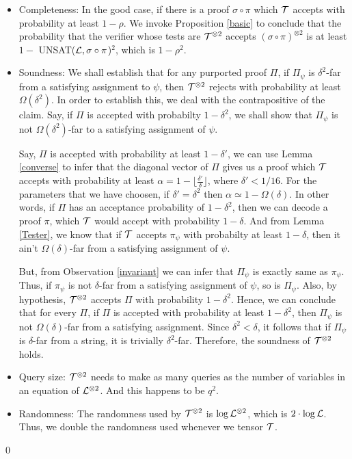 \begin{itemize}
\item Completeness: In the good case, if there is a proof $\sigma
  \circ \pi$ which ${\cal T}$ accepts with probability at least $1 -
  \rho$. We invoke Proposition \ref{basic} to conclude that the
  probability that the verifier whose tests are ${\cal T}^{\otimes 2}$
  accepts $\left(\sigma \circ \pi\right)^{\otimes 2}$ is at least $1
  -$ UNSAT(${\cal L}, \sigma \circ \pi$)$^2$, which is $1 - \rho^2$.

\item Soundness: We shall establish that for any purported proof
  $\Pi$, if $\Pi_\psi$ is $\delta^2$-far from a satisfying assignment
  to $\psi$, then ${\cal T}^{\otimes 2}$ rejects with probability at
  least $\Omega(\delta^2)$.  In order to establish this, we deal with
  the contrapositive of the claim.  Say, if $\Pi$ is accepted with
  probabilty $1 - \delta^2$, we shall show that $\Pi_\psi$ is not
  $\Omega(\delta^2)$-far to a satisfying assignment of $\psi$.

  Say, $\Pi$ is accepted with probability at least $1 - \delta'$, we
  can use Lemma \ref{converse} to infer that the diagonal vector of
  ${\Pi}$ gives us a proof which ${\cal T}$ accepts with probability
  at least $\alpha = 1 - \lfloor \frac{\delta'}{\delta}\rfloor$, where
  $\delta' < 1/16$. For the parameters that we have choosen, if
  $\delta' = \delta^2$ then $\alpha \simeq 1 - \Omega(\delta)$. In
  other words, if $\Pi$ has an acceptance probability of $1 -
  \delta^2$, then we can decode a proof $\pi$, which ${\cal T}$ would
  accept with probability $1 - \delta$. And from Lemma \ref{Tester},
  we know that if ${\cal T}$ accepts $\pi_\psi$ with probabilty at
  least $1 - \delta$, then it ain't $\Omega(\delta)$-far from a
  satisfying assignment of $\psi$.

  But, from Observation \ref{invariant} we can infer that $\Pi_\psi$
  is exactly same as $\pi_\psi$. Thus, if $\pi_\psi$ is not
  $\delta$-far from a satisfying assignment of $\psi$, so is
  $\Pi_\psi$. Also, by hypothesis, ${\cal T}^{\otimes 2}$ accepts
  $\Pi$ with probability $1 - \delta^2$. Hence, we can conclude that
  for every $\Pi$, if $\Pi$ is accepted with probability at least $1 -
  \delta^2$, then $\Pi_\psi$ is not $\Omega(\delta)$-far from a
  satisfying assignment. Since $\delta^2 < \delta$, it follows that if
  $\Pi_\psi$ is $\delta$-far from a string, it is trivially
  $\delta^2$-far. Therefore, the soundness of ${\cal T}^{\otimes 2}$
  holds.  
\item Query size: ${\cal T}^{\otimes 2}$ needs to make as many queries
  as the number of variables in an equation of ${\cal L}^{\otimes 2}$. And
  this happens to be $q^2$.

\item Randomness: The randomness used by ${\cal T}^{\otimes 2}$ is
  $\log {\cal L}^{\otimes 2}$, which is $2 \cdot \log {\cal L}$. Thus, we double
  the randomness used whenever we tensor ${\cal T}$.
\end{itemize}
\qed \\

